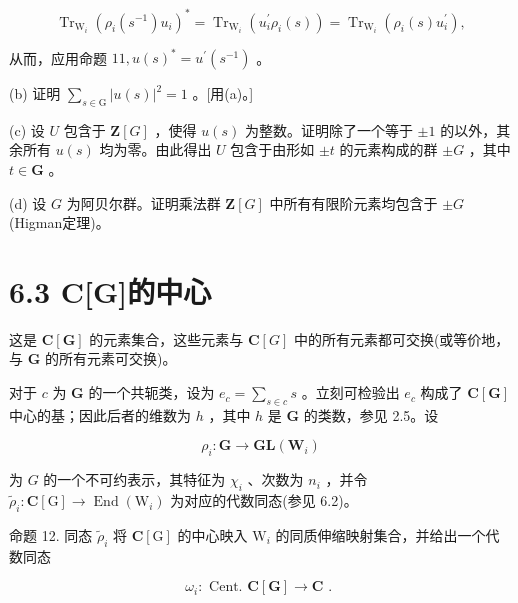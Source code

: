 \documentclass[10pt]{article}
\begin{document}
\[
{\operatorname{Tr}}_{{\mathrm{W}}_{i}}{\left( {\rho }_{i}\left( {s}^{-1}\right) {u}_{i}\right) }^{ * } = {\operatorname{Tr}}_{{\mathrm{W}}_{i}}\left( {{u}_{i}^{\prime }{\rho }_{i}\left( s\right) }\right)  = {\operatorname{Tr}}_{{\mathrm{W}}_{i}}\left( {{\rho }_{i}\left( s\right) {u}_{i}^{\prime }}\right) ,
\]

从而，应用命题 \({11},u{\left( s\right) }^{ * } = {u}^{\prime }\left( {s}^{-1}\right)\) 。

(b) 证明 \(\mathop{\sum }\limits_{{s \in  \mathrm{G}}}{\left| u\left( s\right) \right| }^{2} = 1\) 。[用(a)。]

(c) 设 \(U\) 包含于 \(\mathbf{Z}\left\lbrack  G\right\rbrack\) ，使得 \(u\left( s\right)\) 为整数。证明除了一个等于 \(\pm  1\) 的以外，其余所有 \(u\left( s\right)\) 均为零。由此得出 \(U\) 包含于由形如 \(\pm  t\) 的元素构成的群 \(\pm  G\) ，其中 \(t \in  \mathbf{G}\) 。

(d) 设 \(G\) 为阿贝尔群。证明乘法群 \(\mathbf{Z}\left\lbrack  G\right\rbrack\) 中所有有限阶元素均包含于 \(\pm  G\) (Higman定理)。

\section*{6.3 C[G]的中心}

这是 \(\mathbf{C}\left\lbrack  \mathbf{G}\right\rbrack\) 的元素集合，这些元素与 \(\mathbf{C}\left\lbrack  G\right\rbrack\) 中的所有元素都可交换(或等价地，与 \(\mathbf{G}\) 的所有元素可交换)。

对于 \(c\) 为 \(\mathbf{G}\) 的一个共轭类，设为 \({e}_{c} = \mathop{\sum }\limits_{{s \in  c}}s\) 。立刻可检验出 \({e}_{c}\) 构成了 \(\mathbf{C}\left\lbrack  \mathbf{G}\right\rbrack\) 中心的基；因此后者的维数为 \(h\) ，其中 \(h\) 是 \(\mathbf{G}\) 的类数，参见 2.5。设

\[
{\rho }_{i} : \mathbf{G} \rightarrow  \mathbf{{GL}}\left( {\mathbf{W}}_{i}\right)
\]

为 \(G\) 的一个不可约表示，其特征为 \({\chi }_{i}\) 、次数为 \({n}_{i}\) ，并令 \({\widetilde{\rho }}_{i} : \mathbf{C}\left\lbrack  \mathrm{G}\right\rbrack   \rightarrow  \operatorname{End}\left( {\mathrm{W}}_{i}\right)\) 为对应的代数同态(参见 6.2)。

命题 12. 同态 \({\widetilde{\rho }}_{i}\) 将 \(\mathbf{C}\left\lbrack  \mathrm{G}\right\rbrack\) 的中心映入 \({\mathrm{W}}_{i}\) 的同质伸缩映射集合，并给出一个代数同态

\[
{\omega }_{i} : \text{ Cent. }\mathbf{C}\left\lbrack  \mathbf{G}\right\rbrack   \rightarrow  \mathbf{C}\text{ . }
\]
\end{document}
